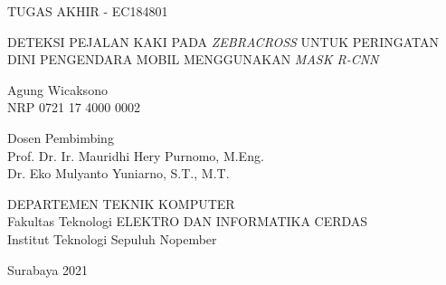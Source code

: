 TUGAS AKHIR - EC184801

\vspace{6ex}

\begin{large}
  DETEKSI PEJALAN KAKI PADA \textit{ZEBRACROSS} UNTUK PERINGATAN DINI PENGENDARA MOBIL MENGGUNAKAN \textit{MASK R-CNN}
\end{large}

\vspace{4ex}

Agung Wicaksono \\
NRP 0721 17 4000 0002

\vspace{2ex}

Dosen Pembimbing \\
Prof. Dr. Ir. Mauridhi Hery Purnomo, M.Eng.\\
Dr. Eko Mulyanto Yuniarno, S.T., M.T.

\vspace{6ex}

DEPARTEMEN TEKNIK KOMPUTER \\
Fakultas Teknologi ELEKTRO DAN INFORMATIKA CERDAS \\
Institut Teknologi Sepuluh Nopember

Surabaya 2021

